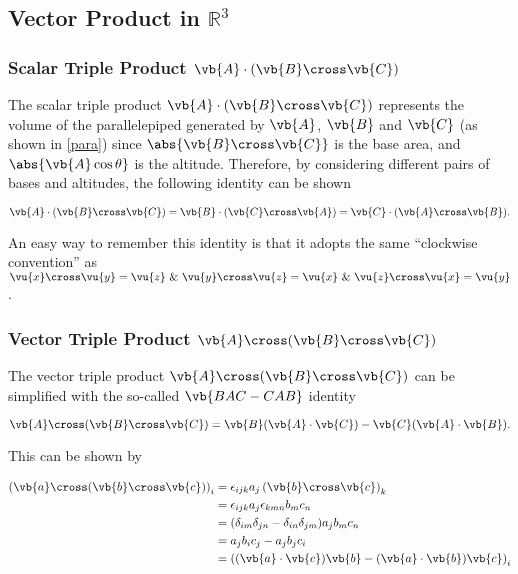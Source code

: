 \documentclass[a4paper,12pt]{report}
\begin{document}
\subsection{Vector Product in \(\mathbb{R}^3 \) }
	
\subsubsection{Scalar Triple Product \(\vb{A} \cdot (\vb{B} \cross \vb{C})\)}
	
The scalar triple product \(\vb{A} \cdot (\vb{B} \cross \vb{C})\) represents the volume of the parallelepiped generated by \(\vb{A}\), \(\vb{B}\) and \(\vb{C}\) (as shown in \cref{para}) since \(\abs{\vb{B} \cross \vb{C}}\) is the base area, and \(\abs{\vb{A}\cos{\theta}}\) is the altitude. Therefore, by considering different pairs of bases and altitudes, the following identity can be shown
	
\begin{equation} 
  \vb{A} \cdot (\vb{B} \cross \vb{C}) = \vb{B} \cdot (\vb{C} \cross \vb{A}) = \vb{C} \cdot (\vb{A} \cross \vb{B}). \label{scatri} 
\end{equation}
	
An easy way to remember this identity is that it adopts the same ``clockwise convention'' as \(\vu{x} \cross \vu{y} = \vu{z} ~  \&  ~ \vu{y} \cross \vu{z} = \vu{x} ~  \&  ~ \vu{z} \cross \vu{x} = \vu{y}\).
	

\subsubsection{Vector Triple Product \(\vb{A} \cross (\vb{B} \cross \vb{C})\)}
	
The vector triple product \(\vb{A} \cross (\vb{B} \cross \vb{C})\) can be simplified with the so-called \(\vb{BAC-CAB}\) identity
	
\begin{equation} 
	\vb{A} \cross (\vb{B} \cross \vb{C}) = \vb{B}(\vb{A} \cdot \vb{C}) - \vb{C}(\vb{A} \cdot \vb{B}). \label{vectri} 
\end{equation}		

This can be shown by 

\begin{equation}
    \begin{aligned} 
    \left( \vb{a} \cross (\vb{b} \cross \vb{c} ) \right)_{i} &= \epsilon _{ijk}a_{j}\left( \vb{b} \cross \vb{c}  \right)_{k} \\
    &= \epsilon _{ijk} a_{j}\epsilon _{kmn}b_{m}c_{n} \\
    &= (\delta _{im}\delta _{jn}-\delta _{in}\delta _{jm}) a_{j}b_{m}c_{n} \\
    &= a_{j}b_{i}c_{j}- a_{j}b_{j}c_{i} \\
    &= \left((\vb{a} \cdot \vb{c} )\vb{b} - (\vb{a} \cdot \vb{b} )\vb{c}\right)_{i}               
    \end{aligned} 
\end{equation}
\end{document}
